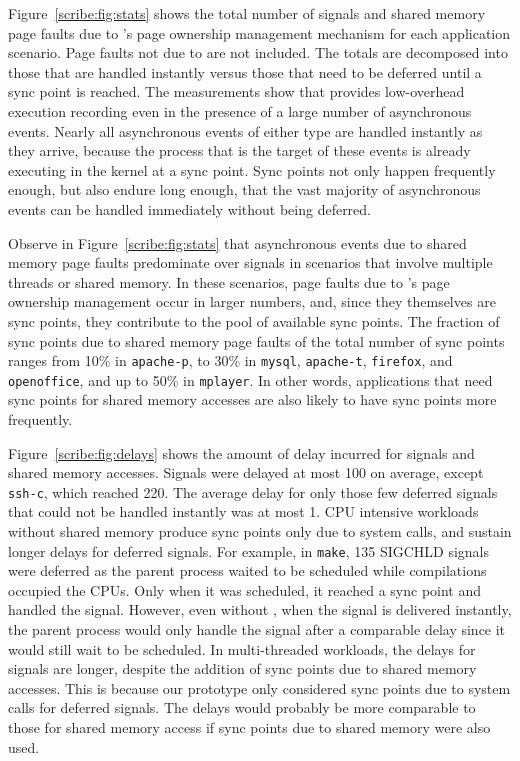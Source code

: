 \begin{table}[]
Figure~\ref{scribe:fig:stats} shows the total number of signals and shared
memory page faults due to \scribe{}'s page ownership management mechanism
for each application scenario.  Page faults not due to \scribe{} are
not included.  The totals are decomposed into those that are handled
instantly versus those that need to be deferred until a sync point is
reached.  The measurements show that \scribe{} provides
low-overhead execution recording even in the presence of a large
number of asynchronous events.  
Nearly all asynchronous events of
either type are handled instantly as they arrive, because the process
that is the target of these events is already executing in the
kernel at a sync point.  Sync points not only happen frequently
enough, but also endure long enough, that the vast majority of
asynchronous events can be handled immediately without being deferred.

Observe in Figure~\ref{scribe:fig:stats} that asynchronous events due to
shared memory page faults predominate over signals in scenarios that
involve multiple threads or shared memory. In these scenarios, page
faults due to \scribe{}'s page ownership management occur in larger
numbers, and, since they themselves are sync points, they contribute
to the pool of available sync points. The fraction of sync points due
to shared memory page faults of the total number of sync points ranges
from 10\% in {\tt apache-p}, to 30\% in {\tt mysql}, {\tt apache-t},
{\tt firefox}, and {\tt openoffice}, and up to 50\% in {\tt mplayer}.
In other words, applications that need sync points for shared memory
accesses are also likely to have sync points more frequently.

Figure~\ref{scribe:fig:delays} shows the amount of delay incurred for signals
and shared memory accesses. Signals were delayed at most 100\us{}
on average, except {\tt ssh-c}, which reached 220\us{}. The average
delay for only those few deferred signals that could not be handled
instantly was at most 1\ms{}. CPU intensive workloads without shared
memory produce sync points only due to system calls, and sustain longer
delays for deferred signals.  For example, in {\tt make}, 135 SIGCHLD
signals were deferred as the parent process waited to be scheduled
while compilations occupied the CPUs. Only when it was scheduled, it
reached a sync point and handled the signal. However, even without
\scribe{}, when the signal is delivered instantly, the parent process
would only handle the signal after a comparable delay since it would
still wait to be scheduled.  In multi-threaded workloads, the
delays for signals are longer, despite the addition of sync points due
to shared memory accesses. This is because our prototype only
considered sync points due to system calls for deferred signals. The
delays would probably be more comparable to those for shared memory
access if sync points due to shared memory were also used.


\end{table}
